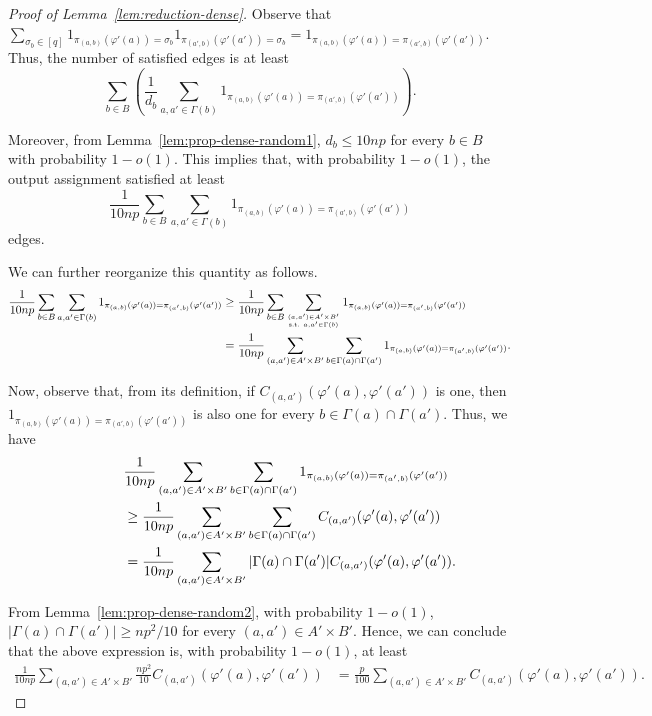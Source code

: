 \documentclass{article}
\begin{document}
\begin{proof}[Proof of Lemma~\ref{lem:reduction-dense}]
Observe that $\sum_{\sigma_b \in [q]} 1_{\pi_{(a, b)}(\varphi'(a)) = \sigma_b}1_{\pi_{(a', b)}(\varphi'(a')) = \sigma_b} = 1_{\pi_{(a, b)}(\varphi'(a)) = \pi_{(a', b)}(\varphi'(a'))}$. Thus, the number of satisfied edges is at least
$$\sum_{b \in B} \left(\frac{1}{d_b} \sum_{a, a' \in \Gamma(b)} 1_{\pi_{(a, b)}(\varphi'(a)) = \pi_{(a', b)}(\varphi'(a'))}\right).$$

Moreover, from Lemma~\ref{lem:prop-dense-random1}, $d_b \leq 10np$ for every $b \in B$ with probability $1 - o(1)$. This implies that, with probability $1 - o(1)$, the output assignment satisfied at least $$\frac{1}{10np} \sum_{b \in B} \sum_{a, a' \in \Gamma(b)} 1_{\pi_{(a, b)}(\varphi'(a)) = \pi_{(a', b)}(\varphi'(a'))}$$ edges.

We can further reorganize this quantity as follows.
\begin{align*}
  \frac{1}{10np} \sum_{b \in B} \sum_{a, a' \in \Gamma(b)} 1_{\pi_{(a, b)}(\varphi'(a)) = \pi_{(a', b)}(\varphi'(a'))} &\geq \frac{1}{10np} \sum_{b \in B} \sum_{{(a, a') \in A' \times B' \atop \text{s.t. } a, a' \in \Gamma(b)}} 1_{\pi_{(a, b)}(\varphi'(a)) = \pi_{(a', b)}(\varphi'(a'))} \\
  &= \frac{1}{10np} \sum_{(a, a') \in A' \times B'} \sum_{b \in \Gamma(a) \cap \Gamma(a')} 1_{\pi_{(a, b)}(\varphi'(a)) = \pi_{(a', b)}(\varphi'(a'))}.
\end{align*}

Now, observe that, from its definition, if $C_{(a, a')}(\varphi'(a), \varphi'(a'))$ is one, then $1_{\pi_{(a, b)}(\varphi'(a)) = \pi_{(a', b)}(\varphi'(a'))}$ is also one for every $b \in \Gamma(a) \cap \Gamma(a')$. Thus, we have
\begin{align*}
  \hspace{1.5cm} &\frac{1}{10np} \sum_{(a, a') \in A' \times B'} \sum_{b \in \Gamma(a) \cap \Gamma(a')} 1_{\pi_{(a, b)}(\varphi'(a)) = \pi_{(a', b)}(\varphi'(a'))} \\
  \hspace{1.5cm} &\geq \frac{1}{10np} \sum_{(a, a') \in A' \times B'} \sum_{b \in \Gamma(a) \cap \Gamma(a')} C_{(a, a')}(\varphi'(a), \varphi'(a')) \\
  \hspace{1.5cm} &= \frac{1}{10np} \sum_{(a, a') \in A' \times B'} |\Gamma(a) \cap \Gamma(a')| C_{(a, a')}(\varphi'(a), \varphi'(a')).
\end{align*}

From Lemma~\ref{lem:prop-dense-random2}, with probability $1 - o(1)$, $|\Gamma(a) \cap \Gamma(a')| \geq np^2/10$ for every $(a, a') \in A' \times B'$. Hence, we can conclude that the above expression is, with probability $1 - o(1)$, at least
\begin{align*}
  \frac{1}{10np} \sum_{(a, a') \in A' \times B'} \frac{np^2}{10} C_{(a, a')}(\varphi'(a), \varphi'(a')) &= \frac{p}{100} \sum_{(a, a') \in A' \times B'} C_{(a, a')}(\varphi'(a), \varphi'(a')).
\end{align*}


\end{proof}
\end{document}
